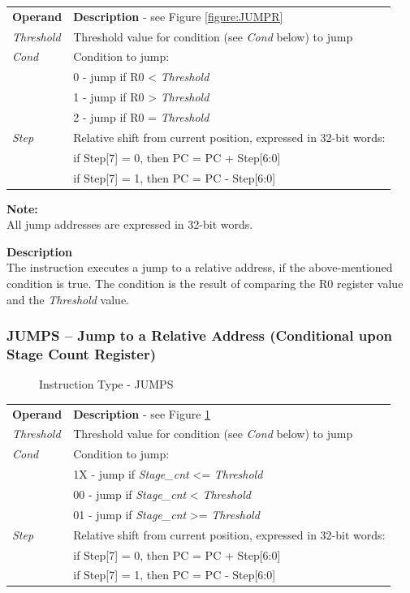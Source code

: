 \documentclass[main\_\_EN.tex]{subfiles}
\begin{document}
\begin{tabular}{ l l }
\textbf{Operand} & \textbf{Description} - see Figure \ref{figure:JUMPR} \\
\textit{Threshold} & Threshold value for condition (see \textit{Cond} below) to jump\\
\textit{Cond} & Condition to jump: \\
 & 0 - jump if R0 < \textit{Threshold} \\
 & 1 - jump if R0 > \textit{Threshold} \\
 & 2 - jump if R0 = \textit{Threshold} \\
\textit{Step} & Relative shift from current position, expressed in 32-bit words:\\
 & if Step[7] = 0, then PC = PC + Step[6:0] \\
 & if Step[7] = 1, then PC = PC - Step[6:0] \\

\end{tabular}

\textbf{Note:} \\
All jump addresses are expressed in 32-bit words.

\textbf{ Description } \\
The instruction executes a jump to a relative address, if the above-mentioned condition is true. The condition is the result of comparing the R0 register value and the \textit{Threshold} value.


\subsubsection{JUMPS – Jump to a Relative Address (Conditional upon Stage Count Register)}\label{jumpstorelativeaddress}

%
%
%
%
%
\begin{figure}[!ht ]
    \centering
    \caption{Instruction Type - JUMPS}
    \label{figure:JUMPS}
\end{figure}

\begin{tabular}{ l l }
\textbf{Operand} & \textbf{Description} - see Figure \ref{figure:JUMPS} \\
\textit{Threshold} & Threshold value for condition (see \textit{Cond} below) to jump\\
\textit{Cond} & Condition to jump: \\
 & 1X - jump if \textit{Stage\_cnt} <= \textit{Threshold} \\
 & 00 - jump if \textit{Stage\_cnt} < \textit{Threshold} \\
 & 01 - jump if \textit{Stage\_cnt} >= \textit{Threshold} \\
\textit{Step} & Relative shift from current position, expressed in 32-bit words: \\
 & if Step[7] = 0, then PC = PC + Step[6:0] \\
 & if Step[7] = 1, then PC = PC - Step[6:0] \\

\end{tabular}
\end{document}
